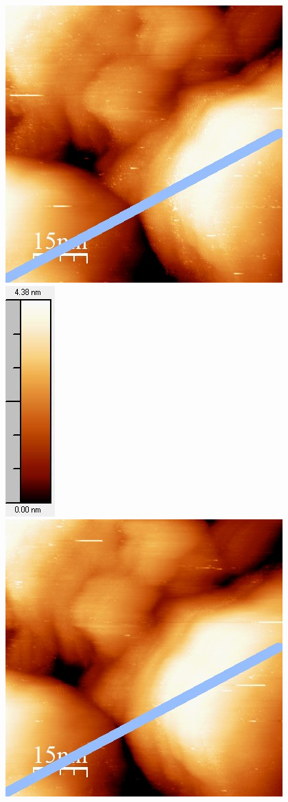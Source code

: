 \documentclass[12pt,a4paper]{article}
\begin{document}
\begin{figure}[H]
\centering
\includegraphics[scale=0.6]{Bilder/Anhang/Zeit/0_1_Zeit_vor.jpg}
\includegraphics[scale=0.6]{Bilder/Anhang/Zeit/0_1_Zeit_vor_Skala.jpg}
\includegraphics[scale=0.6]{Bilder/Anhang/Zeit/0_1_Zeit_nach.jpg}

\end{figure}
\end{document}
